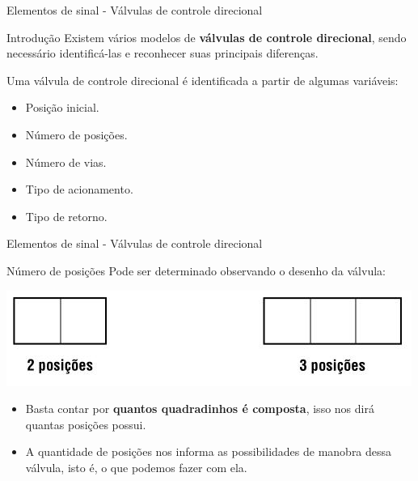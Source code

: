 \begin{frame}{Elementos de sinal - Válvulas de controle direcional}
	\begin{block}{Introdução}
		Existem vários modelos de \textbf{válvulas de controle direcional}, sendo necessário identificá-las e reconhecer suas principais diferenças.
		
		\smallskip
		
		Uma válvula de controle direcional é identificada a partir de algumas variáveis:
		\begin{itemize}
			\item Posição inicial.
			\item Número de posições.
			\item Número de vias.
			\item Tipo de acionamento.
			\item Tipo de retorno.
		\end{itemize}
	\end{block}
\end{frame}


\begin{frame}{Elementos de sinal - Válvulas de controle direcional}
	\begin{block}{Número de posições}
		Pode ser determinado observando o desenho da válvula:
	\end{block}

	\medskip

	\centering
		\includegraphics[width=0.7\linewidth]{Figuras/Ch14/fig04}
		
	\medskip
	
	\begin{block}{}
		\begin{itemize}
			\item Basta contar por \textbf{quantos quadradinhos é composta}, isso nos dirá quantas posições possui.
			\item A quantidade de posições nos informa as possibilidades de manobra dessa válvula, isto é, o que podemos fazer com ela.
		\end{itemize}
	\end{block}
\end{frame}


